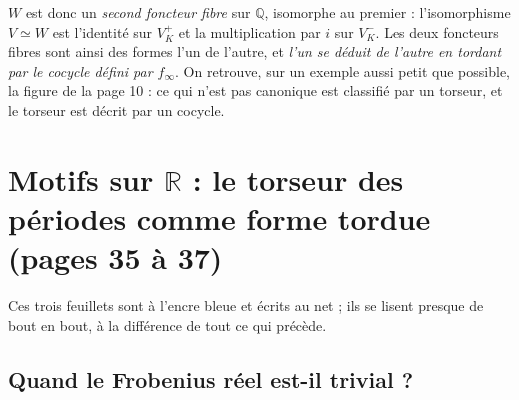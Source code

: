 \documentclass[11pt,a4paper]{article}
\begin{document}
$W$ est donc un \emph{second foncteur fibre} sur $\mathbb{Q}$, isomorphe au
premier : l'isomorphisme $V \simeq W$ est l'identité sur $V^{+}_{K}$ et la
multiplication par $i$ sur $V^{-}_{K}$. Les deux foncteurs fibres sont ainsi des
formes l'un de l'autre, et \emph{l'un se déduit de l'autre en tordant par le
cocycle défini par $f_{\infty}$}. On retrouve, sur un exemple aussi petit que
possible, la figure de la page 10 : ce qui n'est pas canonique est classifié par
un torseur, et le torseur est décrit par un cocycle.

\section*{Motifs sur $\mathbb{R}$ : le torseur des périodes comme forme tordue (pages 35 à 37)}

Ces trois feuillets sont à l'encre bleue et écrits au net ; ils se lisent
presque de bout en bout, à la différence de tout ce qui précède.

\subsection*{Quand le Frobenius réel est-il trivial ?}
\end{document}
